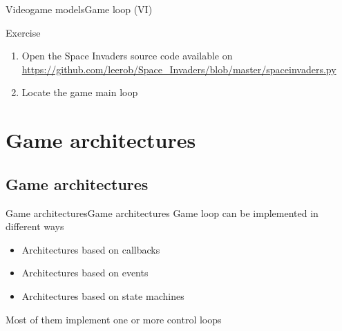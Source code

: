 \documentclass[10pt,compress]{beamer} %
\begin{document}
\begin{frame}{Videogame models}{Game loop (VI)}

		\begin{exampleblock}{Exercise}
			\begin{enumerate}
			\item Open the Space Invaders source code available on \\
			\url{https://github.com/leerob/Space_Invaders/blob/master/spaceinvaders.py}
			\item Locate the game main loop
			\end{enumerate}
		\end{exampleblock}
\end{frame}

\section{Game architectures}
\subsection{Game architectures}

\begin{frame}{Game architectures}{Game architectures}
    Game loop can be implemented in different ways
	\begin{itemize}
		\item Architectures based on callbacks
		\item Architectures based on events
		\item Architectures based on state machines
	\end{itemize}
	Most of them implement one or more control loops
\end{frame}
\end{document}
